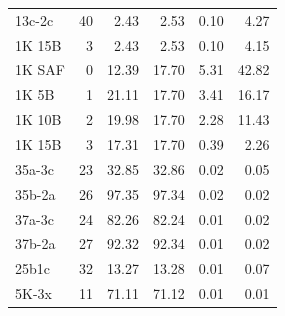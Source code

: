 \begin{tabular}{lrrrrr}
13c-2c & 40 & 2.43 & 2.53 & 0.10 & 4.27 \\
1K 15B & 3 & 2.43 & 2.53 & 0.10 & 4.15 \\
1K SAF & 0 & 12.39 & 17.70 & 5.31 & 42.82 \\
1K 5B & 1 & 21.11 & 17.70 & 3.41 & 16.17 \\
1K 10B & 2 & 19.98 & 17.70 & 2.28 & 11.43 \\
1K 15B & 3 & 17.31 & 17.70 & 0.39 & 2.26 \\
35a-3c & 23 & 32.85 & 32.86 & 0.02 & 0.05 \\
35b-2a & 26 & 97.35 & 97.34 & 0.02 & 0.02 \\
37a-3c & 24 & 82.26 & 82.24 & 0.01 & 0.02 \\
37b-2a & 27 & 92.32 & 92.34 & 0.01 & 0.02 \\
25b1c & 32 & 13.27 & 13.28 & 0.01 & 0.07 \\
5K-3x & 11 & 71.11 & 71.12 & 0.01 & 0.01 \\
\bottomrule
\end{tabular}
